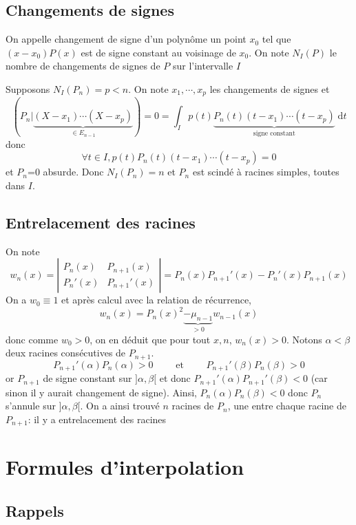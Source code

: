 \subsection{Changements de signes}

On appelle changement de signe d'un polynôme un point $x_0$ tel que $(x-x_0)P(x)$ est de signe constant au voisinage de $x_0$. On note $N_I(P)$ le nombre de changements de signes de $P$ sur l'intervalle $I$

Supposons $N_I(P_n)=p<n$. On note $x_1, \cdots, x_p$ les changements de signes et \[
    (P_n | \underbrace{(X-x_1)\cdots (X-x_p)}_{\in E_{n-1}})=0=\int_Ip(t)\underbrace{P_n(t)(t-x_1)\cdots (t-x_p)}_{\text{signe constant}}\;\mathrm dt
\]
donc \[
    \forall t\in I, p(t)P_n(t)(t-x_1)\cdots (t-x_p)=0
\]
et $P_n$=0 absurde. Donc $N_I(P_n)=n$ et $P_n$ est scindé à racines simples, toutes dans $I$.

\subsection{Entrelacement des racines}

On note \[
    w_n(x)=\left|\begin{matrix}P_n(x) & P_{n+1}(x)\\ P_n'(x) & P_{n+1}'(x)\end{matrix}\right|=P_n(x)P_{n+1}'(x)-P_n'(x)P_{n+1}(x)
\]
On a $w_0\equiv 1$ et après calcul avec la relation de récurrence, \[
    w_n(x)=P_n(x)^2\underbrace{-\mu_{n-1}}_{>0}w_{n-1}(x)
\]
donc comme $w_0>0$, on en déduit que pour tout $x, n$, $w_n(x)>0$. Notons $\alpha < \beta$ deux racines consécutives de $P_{n+1}$. \[
    P_{n+1}'(\alpha)P_n(\alpha)>0\qquad \text{ et }\qquad P_{n+1}'(\beta)P_n(\beta)>0
\] or $P_{n+1}$ de signe constant sur $]\alpha, \beta[$ et donc $P_{n+1}'(\alpha)P_{n+1}'(\beta)<0$ (car sinon il y aurait changement de signe). Ainsi, $P_n(\alpha)P_n(\beta)<0$ donc $P_n$ s'annule sur $]\alpha, \beta[$. On a ainsi trouvé $n$ racines de $P_n$, une entre chaque racine de $P_{n+1}$: il y a entrelacement des racines

\section{Formules d'interpolation}


\subsection{Rappels}

